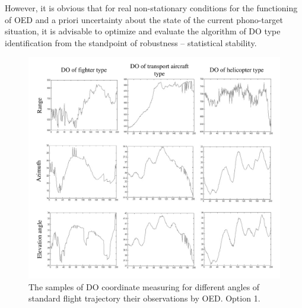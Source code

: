 However, it is obvious that for real non-stationary conditions for the functioning of OED and a priori uncertainty about the state of the current phono-target situation,  it is advisable to optimize and evaluate the algorithm of DO type identification from the standpoint of robustness -- statistical stability.


\begin{figure}[h]
\setcaptionmargin{5mm}
\onelinecaptionstrue
\includegraphics[width=1.0\textwidth]{pics/fig_1_option_1.pdf}
\caption{The samples of DO coordinate measuring for different angles of standard flight trajectory their observations by OED. Option 1.}\label{fig:fig_1_option_1}
\end{figure}

